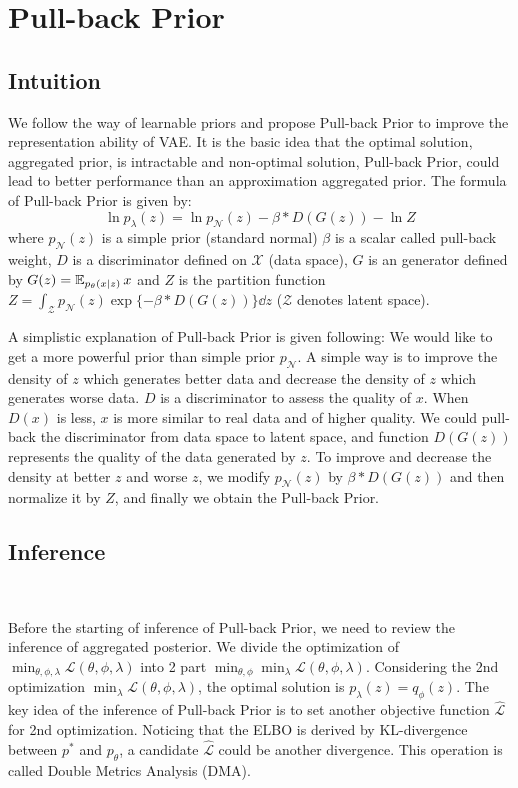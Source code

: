\section{Pull-back Prior}\label{sec:pull_back_prior}

\subsection{Intuition}
We follow the way of learnable priors and propose Pull-back Prior to improve the representation ability of VAE. It is the basic idea that the optimal solution, aggregated prior, is intractable and non-optimal solution, Pull-back Prior, could lead to better performance than an approximation aggregated prior. The formula of Pull-back Prior is given by:
\begin{equation}\label{eq:pull_back_prior}
	\ln p_\lambda(z) = \ln p_\mathcal{N}(z) - \beta * D(G(z)) - \ln Z \tag{4}
\end{equation}
where $p_\mathcal{N}(z)$ is a simple prior (\EG standard normal) $\beta$ is a scalar called pull-back weight, $D$ is a discriminator defined on $\mathcal{X}$ (data space), $G$ is an generator defined by $G(z) = \operatorname{\mathbb{E}}_{p_\theta(x|z)} x$ and $Z$ is the partition function $Z = \int_{\mathcal{Z}} p_\mathcal{N}(z) \exp\{- \beta * D(G(z))\} \dd z$ ($\mathcal{Z}$ denotes latent space).

A simplistic explanation of Pull-back Prior is given following: We would like to get a more powerful prior than simple prior $p_\mathcal{N}$. A simple way is to improve the density of $z$ which generates better data and decrease the density of $z$ which generates worse data. $D$ is a discriminator to assess the quality of $x$. When $D(x)$ is less, $x$ is more similar to real data and of higher quality. We could pull-back the discriminator from data space to latent space, and function $D(G(z))$ represents the quality of the data generated by $z$. To improve and decrease the density at better $z$ and worse $z$, we modify $p_\mathcal{N}(z)$ by $\beta * D(G(z))$ and then normalize it by $Z$, and finally we obtain the Pull-back Prior. 

\subsection{Inference}~\label{subsec:inference}

Before the starting of inference of Pull-back Prior, we need to review the inference of aggregated posterior. We divide the optimization of $\min_{\theta, \phi, \lambda} \mathcal{L}(\theta, \phi, \lambda)$ into 2 part $\min_{\theta, \phi} \min_{\lambda} \mathcal{L}(\theta, \phi, \lambda)$. Considering the 2nd optimization $\min_\lambda \mathcal{L}(\theta, \phi, \lambda)$, the optimal solution is $p_\lambda(z) = q_\phi(z)$. The key idea of the inference of Pull-back Prior is to set another objective function $\hat{\mathcal{L}}$ for 2nd optimization. Noticing that the ELBO is derived by KL-divergence between $p^*$ and $p_\theta$, a candidate $\hat{\mathcal{L}}$ could be another divergence. This operation is called Double Metrics Analysis (DMA). 

